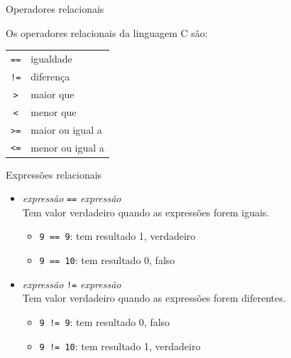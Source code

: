 \documentclass[handout]{beamer}
\newcommand{\cod}[1]{\texttt{#1}}
\begin{document}
\begin{frame}[fragile]{Operadores relacionais}

    Os operadores relacionais da linguagem C são:

    \begin{center}
        \begin{tabular}{|c|l|}
            \hline
            \cod{==} & igualdade \\
            \cod{!=} & diferença \\
            \cod{>}  & maior que \\
            \cod{<}  & menor que \\
            \cod{>=} & maior ou igual a \\
            \cod{<=} & menor ou igual a \\
            \hline
        \end{tabular}
    \end{center}
\end{frame}

\begin{frame}[fragile]{Expressões relacionais}

    \begin{itemize}[<+->]
        \item {\it expressão} \cod{==} {\it expressão} \\
        Tem valor verdadeiro quando as expressões forem iguais.
        \begin{itemize}
            \item \cod{9 == 9}: tem resultado 1, verdadeiro
            \item \cod{9 == 10}: tem resultado 0, falso
        \end{itemize}

        \item {\it expressão} \cod{!=} {\it expressão} \\
        Tem valor verdadeiro quando as expressões forem diferentes.
        \begin{itemize}
            \item \cod{9 != 9}: tem resultado 0, falso
            \item \cod{9 != 10}: tem resultado 1, verdadeiro
        \end{itemize}
    \end{itemize}

\end{frame}
\end{document}
